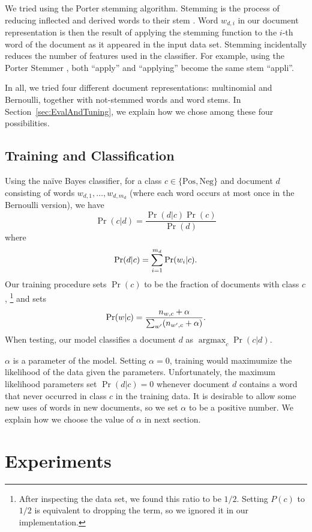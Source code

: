 \documentclass{article}
\DeclareMathOperator{\Argmax}{argmax}
\newcommand{\PosC}{\mathrm{Pos}}
\newcommand{\NegC}{\mathrm{Neg}}
\begin{document}
We tried using the Porter stemming algorithm.
Stemming is the process of reducing inflected and derived words to their stem \cite{porter-stemmer}.
Word \(w_{d,i}\) in our document representation is then the result of applying the stemming function to the \(i\)-th word of the document as it appeared in the input data set.
Stemming incidentally reduces the number of features used in the classifier.
For example, using the Porter Stemmer \cite{porter-stemmer}, both ``apply'' and ``applying'' become the same stem ``appli''.

In all, we tried four different document representations: multinomial and Bernoulli, together with not-stemmed words and word stems.
In Section~\ref{sec:EvalAndTuning}, we explain how we chose among these four possibilities.

\subsection{Training and Classification}

Using the na\"ive Bayes classifier, for a class \(c \in \{\PosC, \NegC\}\) and document \(d\) consisting of words \(w_{d,1},\dotsc,w_{d,m_d}\) (where each word occurs at most once in the Bernoulli version), we have
\[\Pr(c|d)=\frac{\Pr(d|c)\Pr(c)}{\Pr(d)}\]
where
\[\Pr(d|c)=\sum_{i=1}^{m_d}\Pr(w_i|c)\ldotp\]
Our training procedure sets \(\Pr(c)\) to be the fraction of documents with class \(c\),%
\footnote{After inspecting the data set, we found this ratio to be \(1/2\).  Setting \(P(c)\) to \(1/2\) is equivalent to dropping the term, so we ignored it in our implementation.}
and sets
\[\Pr(w|c)=\frac{n_{w,c}+\alpha}{\sum_{w'}(n_{w',c}+\alpha)}\ldotp\]
When testing, our model classifies a document \(d\) as \(\Argmax_c\Pr(c|d)\).

\(\alpha\) is a parameter of the model.
Setting \(\alpha=0\), training would maximumize the likelihood of the data given the parameters.
Unfortunately, the maximum likelihood parameters set \(\Pr(d|c)=0\) whenever document \(d\) contains a word that never occurred in class \(c\) in the training data.
It is desirable to allow some new uses of words in new documents, so we set \(\alpha\) to be a positive number.
We explain how we choose the value of \(\alpha\) in next section.


\section{Experiments}
\label{sec:Results}
\end{document}
